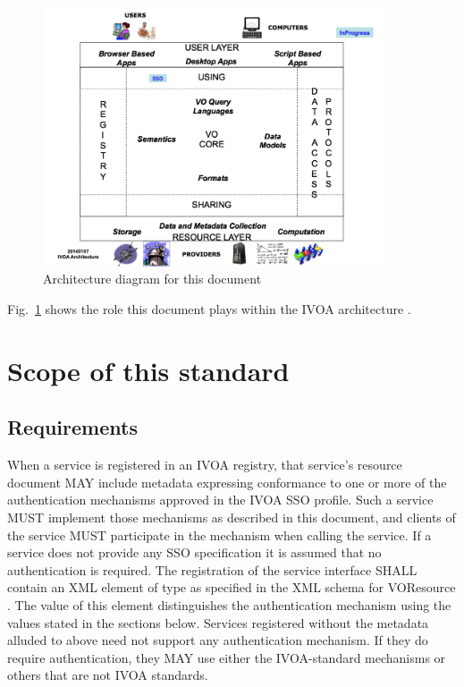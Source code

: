 \documentclass[11pt,a4paper]{ivoa}
\begin{document}
\begin{figure}
\centering

\includegraphics[width=0.9\textwidth]{SSO_image001.png}
\caption{Architecture diagram for this document}
\label{fig:archdiag}
\end{figure}

Fig.~\ref{fig:archdiag} shows the role this document plays within the
IVOA architecture \citep{note:VOARCH}.


\section{Scope of this standard}
\subsection{Requirements}
When a service is registered in an IVOA registry, that service's resource document MAY include metadata expressing conformance to one or more of the authentication mechanisms approved in the IVOA SSO profile. Such a service MUST implement those mechanisms as described in this document, and clients of the service MUST participate in the mechanism when calling the service. If a service does not provide any SSO specification it is assumed that no authentication is required.
The registration of the service interface SHALL contain an XML element
of type  as specified in the XML schema for
VOResource \citep{std:VOR}. The value of this element distinguishes the
authentication mechanism using the values stated in the sections below.
Services registered without the metadata alluded to above need not
support any authentication mechanism. If they do require authentication,
they MAY use either the IVOA-standard mechanisms or others that are not
IVOA standards.
\end{document}

